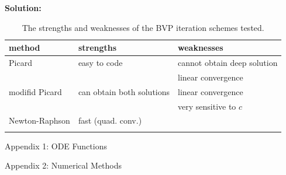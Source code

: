 \documentclass[11pt]{article}
\begin{document}
\begin{enumerate}
\bigskip
\textbf{Solution:} 
\begin{table}[h]
\begin{center}
\begin{tabular}{lll}
  \hline
  method & strengths & weaknesses \\
  \hline
  \hline
  Picard & easy to code & cannot obtain deep solution\\
         & & linear convergence\\
  \hline
  modifid Picard & can obtain both solutions & linear convergence\\
            & & very sensitive to $c$\\
  \hline
  Newton-Raphson & fast (quad. conv.) & \\
            & & \\
  \hline
\end{tabular}
\caption{The strengths and weaknesses of the BVP iteration schemes tested.}
\end{center}
\end{table}

\end{enumerate}

\clearpage
\pagebreak
{\huge Appendix 1: ODE Functions}


\clearpage
\pagebreak
{\huge Appendix 2: Numerical Methods}




\end{document}
